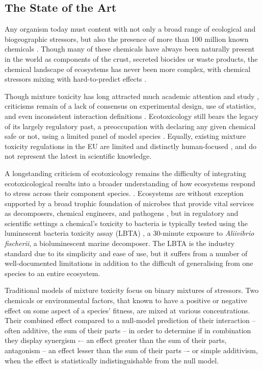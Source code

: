 \documentclass[final,1p,times]{elsarticle}
\begin{document}
\subsection{The State of the Art}

Any organism today must content with not only a broad range of ecological and biogeographic stressors, but also the presence of more than 100 million known chemicals \cite{CAS2015}. Though many of these chemicals have always been naturally present in the world as components of the crust, secreted biocides or waste products, the chemical landscape of ecosystems has never been more complex, with chemical stressors mixing with hard-to-predict effects \cite{EuropeanCommission2012a}. 

Though mixture toxicity has long attracted much academic attention and study \cite{Bliss1939}, criticisms remain of a lack of consensus on experimental design, use of statistics, and even inconsistent interaction definitions \cite{Jackson2016,Piggott2015,Schafer2018}. Ecotoxicology still bears the legacy of its largely regulatory past, a preoccupation with declaring any given chemical safe or not, using a limited panel of model species \cite{OECD2014SectionSystems}. Equally, existing mixture toxicity regulations in the EU are limited and distinctly human-focused \cite{EuropeanCommission2012a}, and do not represent the latest in scientific knowledge.

A longstanding criticism of ecotoxicology remains the difficulty of integrating ecotoxicological results into a broader understanding of how ecosystems respond to stress across their component species. \cite{Chapman2002a,Gessner2016}. Ecosystems are without exception supported by a broad trophic foundation of microbes that provide vital services as decomposers, chemical engineers, and pathogens \cite{Nannipieri2003a,VanderHeijden2008a}, but in regulatory and scientific settings a chemical's toxicity to bacteria is typically tested using the luminescent bacteria toxicity assay (LBTA) \cite{OECD2014SectionSystems}, a 30-minute exposure to \textit{Aliivibrio fischerii}, a bioluminescent marine decomposer. The LBTA is the industry standard due to its simplicity and ease of use, but it suffers from a number of well-documented limitations \cite{Ma2014} in addition to the difficult of generalising from one species to an entire ecosystem.

Traditional models of mixture toxicity focus on binary mixtures of stressors. Two chemicals or environmental factors, that known to have a positive or negative effect on some aspect of a species' fitness, are mixed at various concentrations. Their combined effect compared to a null-model prediction of their interaction -- often additive, the sum of their parts -- in order to determine if in combination they display synergism -– an effect greater than the sum of their parts, antagonism – an effect lesser than the sum of their parts –- or simple additivism, when the effect is statistically indistinguishable from the null model. 
\end{document}
